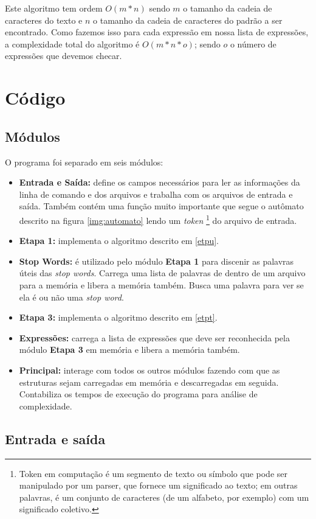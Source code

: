 \documentclass[12pt]{article}
\begin{document}
Este algoritmo tem ordem $O(m * n)$ sendo $m$ o tamanho da cadeia de caracteres do texto e $n$ o tamanho da cadeia de caracteres do padrão a ser encontrado. Como fazemos isso para cada expressão em nossa lista de expressões, a complexidade total do algoritmo é $O(m * n * o)$; sendo $o$ o número de expressões que devemos checar.

\section{Código}

\subsection{Módulos}
O programa foi separado em seis módulos:
\begin{itemize}
\item \textbf{Entrada e Saída:} define os campos necessários para ler as informações da linha de comando e dos arquivos e trabalha com os arquivos de entrada e saída. Também contém uma função muito importante que segue o autômato descrito na figura \ref{img:automato} lendo um \textit{token} \footnote{Token em computação é um segmento de texto ou símbolo que pode ser manipulado por um parser, que fornece um significado ao texto; em outras palavras, é um conjunto de caracteres (de um alfabeto, por exemplo) com um significado coletivo.} do arquivo de entrada.
\item \textbf{Etapa 1:} implementa o algoritmo descrito em \ref{etpu}.
\item \textbf{Stop Words:} é utilizado pelo módulo \textbf{Etapa 1} para discenir as palavras úteis das \textit{stop words}. Carrega uma lista de palavras de dentro de um arquivo para a memória e libera a memória também. Busca uma palavra para ver se ela é ou não uma \textit{stop word}.
\item \textbf{Etapa 3:}  implementa o algoritmo descrito em \ref{etpt}.
\item \textbf{Expressões:} carrega a lista de expressões que deve ser reconhecida pela módulo \textbf{Etapa 3} em memória e libera a memória também.
\item \textbf{Principal:} interage com todos os outros módulos fazendo com que as estruturas sejam carregadas em memória e descarregadas em seguida. Contabiliza os tempos de execução do programa para análise de complexidade.
\end{itemize}

\subsection{Entrada e saída}
\end{document}
